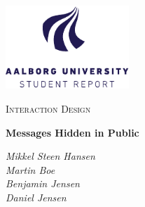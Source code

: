 \begin{titlepage}
    \centering
	\includegraphics[width=0.35\textwidth]{Projectdoc/Assets/Illustrationer/aau_logo_en.pdf}\par\vspace{1cm}
	{\scshape\Large Interaction Design\par}
	\vspace{0.2cm}
	{\huge\bfseries Messages Hidden in Public\par}
	\vspace{2cm}
	{\Large\itshape 
    	Mikkel Steen Hansen\\
        Martin Boe\\
        Benjamin Jensen\\
        Daniel Jensen\\
    \par}
	\vfill
	\vfill
\end{titlepage}